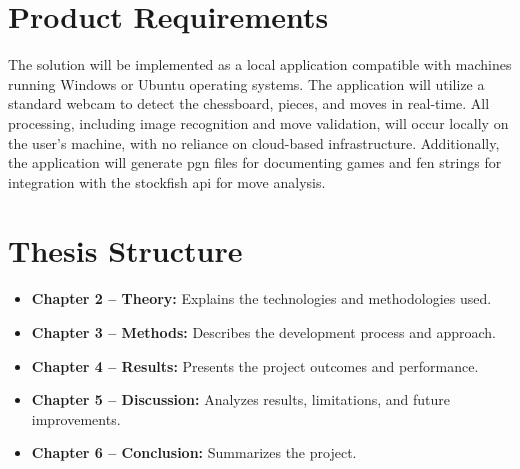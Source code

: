 \section{Product Requirements}

The solution will be implemented as a local application compatible with machines running Windows or Ubuntu operating systems. The application will utilize a standard webcam to detect the chessboard, pieces, and moves in real-time. All processing, including image recognition and move validation, will occur locally on the user's machine, with no reliance on cloud-based infrastructure. Additionally, the application will generate \gls{pgn} files for documenting games and \gls{fen} strings for integration with the \gls{stockfish} \gls{api} for move analysis.





\section{Thesis Structure}

\begin{itemize}
    
    \item \textbf{Chapter 2 -- Theory:} Explains the technologies and methodologies used.
    
    \item \textbf{Chapter 3 -- Methods:} Describes the development process and approach.
    
    \item \textbf{Chapter 4 -- Results:} Presents the project outcomes and performance.
    
    \item \textbf{Chapter 5 -- Discussion:} Analyzes results, limitations, and future improvements.
    
    \item \textbf{Chapter 6 -- Conclusion:} Summarizes the project.
\end{itemize}






%     

